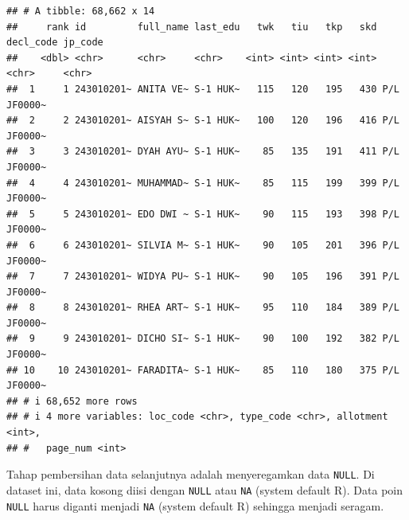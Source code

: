 \documentclass[
]{article}
\newenvironment{Shaded}{\begin{snugshade}}{\end{snugshade}}
\newcommand{\ConstantTok}[1]{\textcolor[rgb]{0.56,0.35,0.01}{#1}}
\newcommand{\FunctionTok}[1]{\textcolor[rgb]{0.13,0.29,0.53}{\textbf{#1}}}
\newcommand{\NormalTok}[1]{#1}
\newcommand{\OtherTok}[1]{\textcolor[rgb]{0.56,0.35,0.01}{#1}}
\newcommand{\SpecialCharTok}[1]{\textcolor[rgb]{0.81,0.36,0.00}{\textbf{#1}}}
\newcommand{\StringTok}[1]{\textcolor[rgb]{0.31,0.60,0.02}{#1}}
\begin{document}
\begin{Shaded}
\end{Shaded}

\begin{verbatim}
## # A tibble: 68,662 x 14
##     rank id         full_name last_edu   twk   tiu   tkp   skd decl_code jp_code
##    <dbl> <chr>      <chr>     <chr>    <int> <int> <int> <int> <chr>     <chr>  
##  1     1 243010201~ ANITA VE~ S-1 HUK~   115   120   195   430 P/L       JF0000~
##  2     2 243010201~ AISYAH S~ S-1 HUK~   100   120   196   416 P/L       JF0000~
##  3     3 243010201~ DYAH AYU~ S-1 HUK~    85   135   191   411 P/L       JF0000~
##  4     4 243010201~ MUHAMMAD~ S-1 HUK~    85   115   199   399 P/L       JF0000~
##  5     5 243010201~ EDO DWI ~ S-1 HUK~    90   115   193   398 P/L       JF0000~
##  6     6 243010201~ SILVIA M~ S-1 HUK~    90   105   201   396 P/L       JF0000~
##  7     7 243010201~ WIDYA PU~ S-1 HUK~    90   105   196   391 P/L       JF0000~
##  8     8 243010201~ RHEA ART~ S-1 HUK~    95   110   184   389 P/L       JF0000~
##  9     9 243010201~ DICHO SI~ S-1 HUK~    90   100   192   382 P/L       JF0000~
## 10    10 243010201~ FARADITA~ S-1 HUK~    85   110   180   375 P/L       JF0000~
## # i 68,652 more rows
## # i 4 more variables: loc_code <chr>, type_code <chr>, allotment <int>,
## #   page_num <int>
\end{verbatim}

Tahap pembersihan data selanjutnya adalah menyeregamkan data
\texttt{NULL}. Di dataset ini, data kosong diisi dengan \texttt{NULL}
atau \texttt{NA} (system default R). Data poin \texttt{NULL} harus
diganti menjadi \texttt{NA} (system default R) sehingga menjadi seragam.

\begin{Shaded}
\end{Shaded}
\end{document}
